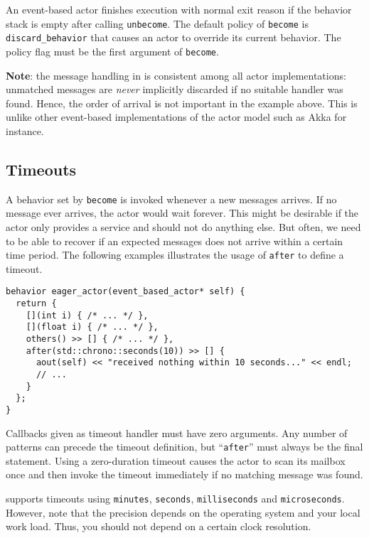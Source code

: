 An event-based actor finishes execution with normal exit reason if the behavior stack is empty after calling \lstinline^unbecome^.
The default policy of \lstinline^become^ is \lstinline^discard_behavior^ that causes an actor to override its current behavior.
The policy flag must be the first argument of \lstinline^become^.

\textbf{Note}: the message handling in \lib is consistent among all actor implementations: unmatched messages are \textit{never} implicitly discarded if no suitable handler was found.
Hence, the order of arrival is not important in the example above.
This is unlike other event-based implementations of the actor model such as Akka for instance.

\clearpage
\subsection{Timeouts}
\label{Sec::Receive::Timeouts}

A behavior set by \lstinline^become^ is invoked whenever a new messages arrives.
If no message ever arrives, the actor would wait forever.
This might be desirable if the actor only provides a service and should not do anything else.
But often, we need to be able to recover if an expected messages does not arrive within a certain time period. The following examples illustrates the usage of \lstinline^after^ to define a timeout.

\begin{lstlisting}
behavior eager_actor(event_based_actor* self) {
  return {
    [](int i) { /* ... */ },
    [](float i) { /* ... */ },
    others() >> [] { /* ... */ },
    after(std::chrono::seconds(10)) >> [] {
      aout(self) << "received nothing within 10 seconds..." << endl;
      // ...
    }
  };
}
\end{lstlisting}

Callbacks given as timeout handler must have zero arguments.
Any number of patterns can precede the timeout definition, but  ``\lstinline^after^'' must always be the final statement.
Using a zero-duration timeout causes the actor to scan its mailbox once and then invoke the timeout immediately if no matching message was found.

\lib supports timeouts using \lstinline^minutes^, \lstinline^seconds^, \lstinline^milliseconds^ and \lstinline^microseconds^.
However, note that the precision depends on the operating system and your local work load.
Thus, you should not depend on a certain clock resolution.

